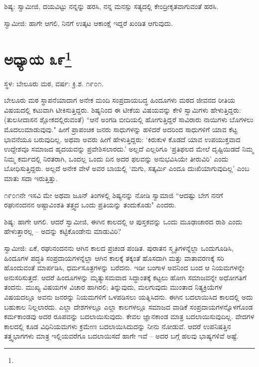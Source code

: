 ಶಿಷ್ಯ: ಸ್ವಾಮೀಜಿ, ದಯವಿಟ್ಟು ನನ್ನನ್ನು ಹರಸಿ, ನನ್ನ ಮನಸ್ಸು ಸತ್ಯದಲ್ಲಿ ಕೇಂದ್ರೀಕೃತವಾಗುವಂತೆ ಹರಸಿ.

ಸ್ವಾಮೀಜಿ: ಹಾಗೇ ಆಗಲಿ, ನಿನಗೆ ಉತ್ಕಟ ಆಕಾಂಕ್ಷೆ ಇದ್ದರೆ ಖಂಡಿತ ಆಗುವುದು.

\newpage

\chapter[ಅಧ್ಯಾಯ ೩೯]{ಅಧ್ಯಾಯ ೩೯\protect\footnote{}}

\centerline{ಸ್ಥಳ: ಬೇಲೂರು ಮಠ, ವರ್ಷ: ಕ್ರಿ.ಶ. ೧೯೦೧.}

ಬೇಲೂರು ಮಠ ಸ್ಥಾಪನೆಯಾದಾಗ ಅನೇಕ ಮಂದಿ ಸಂಪ್ರದಾಯಬದ್ಧ ಹಿಂದೂಗಳು ಮಠದ ಜೀವನದ ರೀತಿಯ ವಿಷಯದಲ್ಲಿ ಕಟುವಾಗಿ ಟೀಕಿಸುತ್ತಿದ್ದರು. ಶಿಷ್ಯನಿಂದ ಈ ಟೀಕೆಯ ವಿಷಯವನ್ನು ಕೇಳಿ ಸ್ವಾಮಿಗಳು ಹೇಳುತ್ತಿದ್ದರು: (ತುಲಸೀದಾಸನ ಶ್ಲೋಕದಲ್ಲಿರುವಂತೆ) “ಆನೆ ಅಂಗಡಿ ಬೀದಿಯಲ್ಲಿ ಹೋಗುತ್ತಿದ್ದರೆ ಸಾವಿರಾರು ನಾಯಿಗಳು ಬೊಗಳಲು ಮೊದಲುಮಾಡುವುವು." ಹೀಗೆ ಪ್ರಾಪಂಚಿಕ ಜನರು ಸಾಧುಗಳನ್ನು ಹಳಿದರೆ ಅದರಿಂದ ಸಾಧುಗಳಿಗೆ ಯಾವ ಕೆಟ್ಟ ಭಾವನೆಯೂ ಬರುವುದಿಲ್ಲ. ಅಥವಾ ಅವರು ಹೀಗೆ ಹೇಳುತ್ತಿದ್ದರು: ‘ಕಿರುಕುಳ ಕೊಡದೆ ಯಾವ ಉಪಯುಕ್ತವಾದ ಉದ್ದೇಶವೂ ಸಮಾಜದ ಹೃದಯವನ್ನು ಪ್ರವೇಶಿಸಲಾರದು.’ ಅಲ್ಲದೆ ಎಲ್ಲರಿಗೂ ‘ಪ್ರತಿಫಲದ ಮೇಲೆ ದೃಷ್ಟಿಯಿಡದೆ ನಿಮ್ಮ ನಿಮ್ಮ ಕರ್ಮದಲ್ಲಿ ನಿರತರಾಗಿ, ಒಂದಲ್ಲ ಒಂದು ದಿನ ಅದರ ಫಲವನ್ನು ಅನುಭವಿಸಿಯೇ ತೀರುವಿರಿ’ ಎಂದು ಬೋಧಿಸುತ್ತಿದ್ದರು. ಅಲ್ಲದೆ ಅನೇಕ ವೇಳೆ ಅವರ ಬಾಯಲ್ಲಿ ‘ಮಗು, ಸತ್ಕರ್ಮಿ ಎಂದೂ ದುಃಖಿಯಾಗುವುದಿಲ್ಲ’ ಎಂಬ ಮಾತು ಸದಾ ಇರುತ್ತಿತ್ತು.

೧೯೦೧ನೇ ಇಸವಿ ಮೇ ಅಥವಾ ಜೂನ್ ತಿಂಗಳಲ್ಲಿ ಶಿಷ್ಯನನ್ನು ನೋಡಿ ಸ್ವಾಮಾಜಿ “ಆದಷ್ಟು ಬೇಗ ನನಗೆ ರಘುನಂದನನ ಅಷ್ಟಾವಿಂಶತಿ ತತ್ತ್ವದ ಒಂದು ಪ್ರತಿಯನ್ನು ತಂದುಕೊಡು" ಎಂದರು.

ಶಿಷ್ಯ: ಹಾಗೇ ಆಗಲಿ. ಆದರೆ ಸ್ವಾಮೀಜಿ, ಈಗಿನ ಕಾಲದಲ್ಲಿ ಆ ಪುಸ್ತಕವನ್ನು ಒಂದು ಮೂಢಾಚಾರದ ರಾಶಿ ಎಂದು ಹೇಳುತ್ತಾರಲ್ಲ – ಅದನ್ನು ಕಟ್ಟಿಕೊಂಡೇನು ಮಾಡುವಿರಿ?

ಸ್ವಾಮೀಜಿ: ಏಕೆ, ರಘುನಂದನನು ಆಗಿನ ಕಾಲದ ಪ್ರಚಂಡ ಪಂಡಿತ. ಪುರಾತನ ಸ್ಮೃತಿಗಳನ್ನೆಲ್ಲಾ ಒಂದುಗೂಡಿಸಿ, ಹಿಂದೂಗಳ ಪದ್ಧತಿ ಸಂಪ್ರದಾಯಗಳನ್ನೆಲ್ಲಾ ಆಗಿನ ಕಾಲಕ್ಕೆ ತಕ್ಕಂತೆ ಹೊಸದಾಗಿ ಮತ್ತು ವಾತಾವರಣಕ್ಕೆ ಸರಿ ಹೊಂದುವಂತೆ ಮಾರ್ಪಡಿಸಿ, ಧರ್ಮಸೂತ್ರಗಳನ್ನು ಬರೆದನು. ಇಡೀ ಬಂಗಾಳ ಅವನಿಂದ ಬಂದ ಆ ನಿಯಮಗಳನ್ನೇ ಅನುಸರಿಸುತ್ತದೆ. ಆದರೆ ಹಿಂದೂಗಳನ್ನು ಮೃತ್ಯುಸಮವಾದ ಸಿದ್ಧಾಂತಕ್ಕೆ ಕಟ್ಟಲು ಹೋಗಿ ಸಮಾಜವನ್ನೇ ಅಧೋಗತಿಗೆ ತಂದನು. ಮುಖ್ಯ ವಿಷಯಗಳ ವಿಚಾರ ಹಾಗಿರಲಿ; ತಿನ್ನುವುದು, ಮಲಗುವುದು ಮುಂತಾದ ನಿತ್ಯಕ್ರಿಯೆಗಳ ವಿಷಯದಲ್ಲೂ ಅವನು ಜನರನ್ನು ನಿಯಮಗಳಿಗೆ ಒಳಪಡಿಸಲು ಯತ್ನಿಸಿದನು. ಈಗಿನ ಬದಲಾಯಿಸಿದ ಕಾಲದಲ್ಲಿ ಅದು ಬಹುಕಾಲ ನಿಲ್ಲಲಾರದು. ಎಲ್ಲಾ ದೇಶಗಳಲ್ಲೂ ಎಲ್ಲಾ ಕಾಲಗಳಲ್ಲೂ ಸಮಾಜದ ವಾಡಿಕೆ ಸಂಪ್ರದಾಯಗಳನ್ನೊಳಗೊಂಡ ಕರ್ಮಕಾಂಡವು ಅದರ ರೂಪವನ್ನು ಬದಲಾಯಿಸುವುದು. ಕೇವಲ ಜ್ಞಾನಕಾಂಡ ಮಾತ್ರ ಬದಲಾಯಿಸುವುದಿಲ್ಲ. ವೇದಗಳ ಕಾಲದಲ್ಲಿ ಕೂಡ ವಿಧಿನಿಯಮಗಳು ಕ್ರಮೇಣ ಬದಲಾಯಿಸಿದುದನ್ನು ನೀನು ನೋಡುವೆ. ಆದರೆ ಉಪನಿಷತ್ತಿನ ತತ್ತ್ವಭಾಗಗಳು ಮಾತ್ರ ಇಲ್ಲಿಯವರೆಗೂ ಬದಲಾಯಿಸದೆ ಹಾಗೇ ಇವೆ – ಅದರ ಬಗ್ಗೆ ಹಲವು ಭಾಷ್ಯಗಳಿವೆ ಅಷ್ಟೆ.

